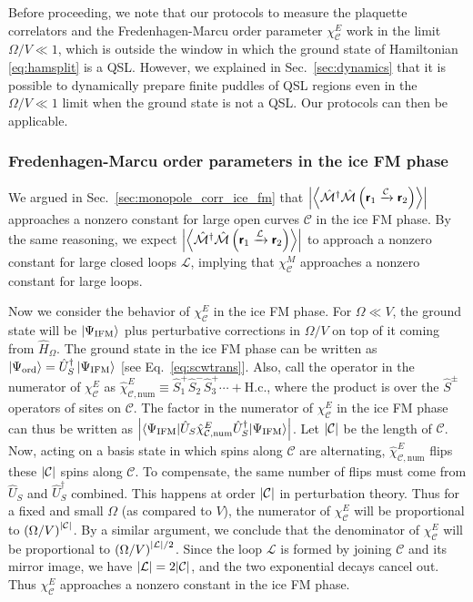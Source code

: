 \documentclass[twocolumn,superscriptaddress,amsmath,amssymb,aps,prx,nofootinbib]{revtex4-2}
\newcommand{\dual}[1]{\boldsymbol{\mathsf{#1}}}
\begin{document}
Before proceeding, we note that our protocols to measure the plaquette correlators and the Fredenhagen-Marcu order parameter $\chi_\mathcal{C}^E$ work in the limit $\Omega/V \ll 1$, which is outside the window in which the ground state of Hamiltonian \eqref{eq:hamsplit} is a QSL. However, we explained in Sec.~\ref{sec:dynamics} that it is possible to dynamically prepare finite puddles of QSL regions even in the $\Omega /V \ll 1$ limit when the ground state is not a QSL. Our protocols can then be applicable. 

\subsubsection{Fredenhagen-Marcu order parameters in the ice FM phase}
\label{sec:FM_ice_fm}

We argued in Sec.~\ref{sec:monopole_corr_ice_fm} that $\abs{ \expval{ \hat{\mathcal{M}}^\dagger \hat{\mathcal{M}} \left(\dual{r}_1 \xrightarrow{\mathcal{C}} \dual{r}_2 \right)} }$ approaches a nonzero constant for large open curves $\mathcal{C}$ in the ice FM phase. By the same reasoning, we expect  $\abs{ \expval{ \hat{\mathcal{M}}^\dagger \hat{\mathcal{M}} \left(\dual{r}_1 \xrightarrow{\mathcal{L}} \dual{r}_2 \right) } }$ to approach a nonzero constant for large closed loops $\mathcal{L}$, implying that $\chi_\mathcal{C}^M$ approaches a nonzero constant for large loops.

Now we consider the behavior of $\chi_{\mathcal{C}}^E$ in the ice FM phase. 
For $\Omega \ll V$, the ground state will be $\ket{\Psi_\text{IFM}}$ plus perturbative corrections in $\Omega/V$ on top of it coming from $\hat{H}_\Omega$. 
The ground state in the ice FM phase can be written as $\ket{\Psi_{\text{ord}}} = \hat{U}_S^\dagger \ket{\Psi_{\text{IFM}} }$ [see Eq.~\eqref{eq:scwtrans}]. 
Also, call the operator in the numerator of $\chi_{\mathcal{C}}^E$ as $\hat{\chi}_{\mathcal{C}, \text{num}}^E \equiv \hat{S}_1^+ \hat{S}_2^- \hat{S}_3^+\cdots + \text{H.c.}$, where the product is over the $\hat{S}^\pm$ operators of sites on $\mathcal{C}$.
The factor in the numerator of $\chi_\mathcal{C}^E$ in the ice FM phase can thus be written as $\abs{\langle \Psi_{\text{IFM}} | \hat{U}_S \hat{\chi}_{\mathcal{C}, \text{num}}^E \hat{U}_S^\dagger | \Psi_{\text{IFM}} \rangle} $. Let $\abs{\mathcal{C}}$ be the length of $\mathcal{C}$. Now, acting on a basis state in which spins along $\mathcal{C}$ are alternating, $\hat{\chi}_{\mathcal{C}, \text{num}}^E$ flips these $\abs{\mathcal{C}}$ spins along $\mathcal{C}$.
To compensate, the same number of flips must come from $\hat{U}_S$ and $\hat{U}_S^\dagger$ combined. 
This happens at order $\abs{\mathcal{C}}$ in perturbation theory.
Thus for a fixed and small $\Omega$ (as compared to $V$), the numerator of $\chi_\mathcal{C}^E$ will be proportional to $\left( \Omega/V \right) ^ {\abs{\mathcal{C}}  }$.
By a similar argument, we conclude that the denominator of $\chi_\mathcal{C}^E$ will be proportional to $\left( \Omega / V \right) ^ {\abs{\mathcal{L}} /2 }$.
Since the loop $\mathcal{L}$ is formed by joining $\mathcal{C}$ and its mirror image, we have $\abs{\mathcal{L}} = 2\abs{\mathcal{C}}$, and the two exponential decays cancel out. 
Thus $\chi_{\mathcal{C}}^E$ approaches a nonzero constant in the ice FM phase.
\end{document}
